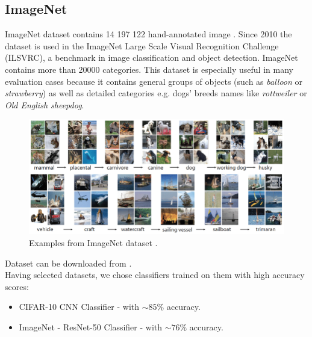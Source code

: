 \documentclass[11pt,a4paper,openany]{book}
\begin{document}
\subsection*{ImageNet} 
\noindent ImageNet dataset contains 14 197 122 hand-annotated image \cite{imagenet_data}. Since 2010 the dataset is used in the ImageNet Large Scale Visual Recognition Challenge (ILSVRC), a benchmark in image classification and object detection.  ImageNet contains more than 20000 categories. This dataset is especially useful in many evaluation cases because it contains general groups of objects (such as \textit{balloon} or \textit{strawberry}) as well as detailed categories e.g. dogs' breeds names like \textit{rottweiler} or \textit{Old English sheepdog}.
\begin{figure}[H]
    \centering
    \includegraphics[scale=0.5]{figs/imagenet.png}
    \caption{Examples from ImageNet dataset \cite{imagenet_example}.}
\end{figure}
\noindent Dataset can be downloaded from \cite{imagenet_data}. \\
\newline
\noindent Having selected datasets, we chose classifiers trained on them with high accuracy scores:\\
\begin{itemize}
\item CIFAR-10 CNN Classifier \cite{cifar10_classifier} - with $ \sim 85\% $ accuracy.
\item ImageNet - ResNet-50 Classifier \cite{resnet} -  with $ \sim 76\% $ accuracy. 
\end{itemize}
\end{document}
